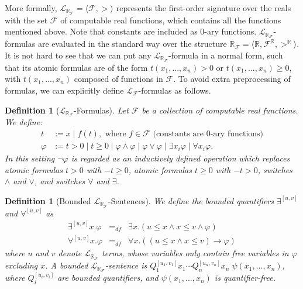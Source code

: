 \documentclass[12pt]{article}
\theoremstyle{plain}
\newtheorem{definition}[theorem]{Definition}
\theoremstyle{definition}
\newcommand{\lrf}{\mathcal{L}_{\mathbb{R}_{\mathcal{F}}}}
\begin{document}
More formally, $\lrf = \langle \mathcal{F}, > \rangle$ represents the first-order signature over the reals with the set $\mathcal{F}$ of computable real functions, which contains all the functions mentioned above. Note that constants are included as 0-ary functions. $\lrf$-formulas are evaluated in the standard way over the structure $\mathbb{R}_{\mathcal{F}}= \langle \mathbb{R}, \mathcal{F}^{\mathbb{R}}, >^{\mathbb{R}}\rangle$. It is not hard to see that  we can put any $\lrf$-formula in a normal form, such that its atomic formulas are of the form $t(x_1,...,x_n)>0$ or $t(x_1,...,x_n)\geq 0$, with $t(x_1,...,x_n)$ composed of functions in $\mathcal{F}$. To avoid extra preprocessing of formulas, we can explicitly define $\mathcal{L}_{\mathcal{F}}$-formulas as follows.
\begin{definition}[$\lrf$-Formulas]
Let $\mathcal{F}$ be a collection of computable real functions. We define:
\begin{align*}
t& := x \; | \; f(t), \mbox{ where }f\in \mathcal{F} \mbox{ (constants are 0-ary functions)}\\
\varphi& := t> 0 \; | \; t\geq 0 \; | \; \varphi\wedge\varphi
\; | \; \varphi\vee\varphi \; | \; \exists x_i\varphi \; |\; \forall x_i\varphi.
\end{align*}
In this setting $\neg\varphi$ is regarded as an inductively defined operation
which replaces atomic formulas $t>0$ with $-t\geq 0$, atomic formulas $t\geq 0$
with $-t>0$, switches $\wedge$ and $\vee$, and switches $\forall$ and $\exists$.
\end{definition}
\begin{definition}[Bounded $\lrf$-Sentences]
We define the bounded quantifiers $\exists^{[u,v]}$ and $\forall^{[u,v]}$ as
\begin{eqnarray*}
\exists^{[u,v]}x.\varphi &=_{df}&\exists x. ( u \leq x \land x \leq v \wedge
\varphi)\\
\forall^{[u,v]}x.\varphi &=_{df}& \forall x. ( (u \leq x \land x \leq v)
\rightarrow \varphi)
\end{eqnarray*}
where $u$ and $v$ denote $\lrf$ terms, whose variables only
contain free variables in $\varphi$ excluding $x$. A {\em bounded $\lrf$-sentence} is
$Q_1^{[u_1,v_1]}x_1\cdots Q_n^{[u_n,v_n]}x_n\;\psi(x_1,...,x_n),$ where $Q_i^{[u_i,v_i]}$ are bounded quantifiers, and $\psi(x_1,...,x_n)$ is
quantifier-free.
\end{definition}
\end{document}

